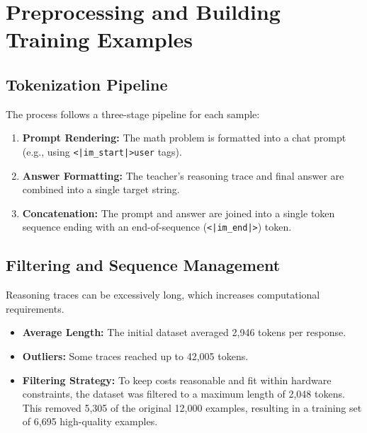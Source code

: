 ﻿\section{Preprocessing and Building Training Examples}
\label{sec:timeline-and-milestones}

\subsection{Tokenization Pipeline}

The process follows a three-stage pipeline for each sample:

\begin{enumerate}
    \item \textbf{Prompt Rendering:} The math problem is formatted into a chat prompt (e.g., using \texttt{<|im\_start|>user} tags).
    \item \textbf{Answer Formatting:} The teacher's reasoning trace and final answer are combined into a single target string.
    \item \textbf{Concatenation:} The prompt and answer are joined into a single token sequence ending with an end-of-sequence (\texttt{<|im\_end|>}) token.
\end{enumerate}

\subsection{Filtering and Sequence Management}

Reasoning traces can be excessively long, which increases computational requirements.

\begin{itemize}
    \item \textbf{Average Length:} The initial dataset averaged 2,946 tokens per response.
    \item \textbf{Outliers:} Some traces reached up to 42,005 tokens.
    \item \textbf{Filtering Strategy:} To keep costs reasonable and fit within hardware constraints, the dataset was filtered to a maximum length of 2,048 tokens. This removed 5,305 of the original 12,000 examples, resulting in a training set of 6,695 high-quality examples.
\end{itemize}